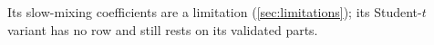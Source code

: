 Its slow-mixing coefficients are a limitation (\cref{sec:limitations}); its Student-$t$ variant
has no row and still rests on its validated parts. %
